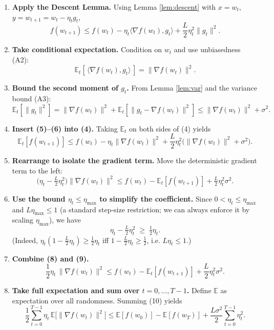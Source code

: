 \documentclass{article}
\begin{document}
\begin{enumerate}[label=[Step \arabic*], leftmargin=*]
\item \textbf{Apply the Descent Lemma.}  
Using Lemma \ref{lem:descent} with $x=w_{t}$, $y=w_{t+1}=w_{t}-\eta_{t}g_{t}$,
\[
f(w_{t+1})\le f(w_{t})-\eta_{t}\langle\nabla f(w_{t}),g_{t}\rangle
+\frac{L}{2}\eta_{t}^{2}\|g_{t}\|^{2}.
\tag{4}
\]

\item \textbf{Take conditional expectation.}  
Condition on $w_{t}$ and use unbiasedness (A2):
\[
\mathbb{E}_{t}[\,\langle\nabla f(w_{t}),g_{t}\rangle\,]
= \|\nabla f(w_{t})\|^{2}.
\tag{5}
\]

\item \textbf{Bound the second moment of $g_{t}$.}  
From Lemma \ref{lem:var} and the variance bound (A3):
\[
\mathbb{E}_{t}[\|g_{t}\|^{2}]
= \|\nabla f(w_{t})\|^{2}+\mathbb{E}_{t}[\|g_{t}-\nabla f(w_{t})\|^{2}]
\le \|\nabla f(w_{t})\|^{2}+\sigma^{2}.
\tag{6}
\]

\item \textbf{Insert (5)–(6) into (4).}  
Taking $\mathbb{E}_{t}$ on both sides of (4) yields
\[
\mathbb{E}_{t}[f(w_{t+1})]\le
f(w_{t})-\eta_{t}\|\nabla f(w_{t})\|^{2}
+\frac{L}{2}\eta_{t}^{2}\bigl(\|\nabla f(w_{t})\|^{2}+\sigma^{2}\bigr).
\tag{7}
\]

\item \textbf{Rearrange to isolate the gradient term.}  
Move the deterministic gradient term to the left:
\[
\bigl(\eta_{t}-\tfrac{L}{2}\eta_{t}^{2}\bigr)\|\nabla f(w_{t})\|^{2}
\le f(w_{t})-\mathbb{E}_{t}[f(w_{t+1})]
+\tfrac{L}{2}\eta_{t}^{2}\sigma^{2}.
\tag{8}
\]

\item \textbf{Use the bound $\eta_{t}\le \eta_{\max}$ to simplify the coefficient.}  
Since $0<\eta_{t}\le\eta_{\max}$ and $L\eta_{\max}\le 1$ (a standard step‑size
restriction; we can always enforce it by scaling $\eta_{\max}$), we have
\[
\eta_{t}-\tfrac{L}{2}\eta_{t}^{2}\;\ge\;\tfrac{1}{2}\eta_{t}.
\tag{9}
\]
(Indeed, $\eta_{t}(1-\frac{L}{2}\eta_{t})\ge\frac12\eta_{t}$ iff
$1-\frac{L}{2}\eta_{t}\ge\frac12$, i.e. $L\eta_{t}\le1$.)

\item \textbf{Combine (8) and (9).}
\[
\frac{1}{2}\eta_{t}\,\|\nabla f(w_{t})\|^{2}
\le f(w_{t})-\mathbb{E}_{t}[f(w_{t+1})]
+\frac{L}{2}\eta_{t}^{2}\sigma^{2}.
\tag{10}
\]

\item \textbf{Take full expectation and sum over $t=0,\dots,T-1$.}  
Define $\mathbb{E}$ as expectation over all randomness. Summing (10) yields
\[
\frac{1}{2}\sum_{t=0}^{T-1}\eta_{t}\,
\mathbb{E}\!\bigl[\|\nabla f(w_{t})\|^{2}\bigr]
\le \mathbb{E}[f(w_{0})]-\mathbb{E}[f(w_{T})]
+\frac{L\sigma^{2}}{2}\sum_{t=0}^{T-1}\eta_{t}^{2}.
\tag{11}
\]


\end{enumerate}
\end{document}

